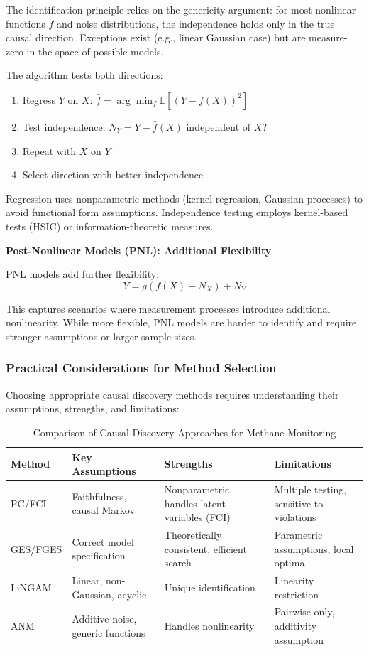 The identification principle relies on the genericity argument: for most nonlinear functions $f$ and noise distributions, the independence holds only in the true causal direction. Exceptions exist (e.g., linear Gaussian case) but are measure-zero in the space of possible models.

The algorithm tests both directions:
\begin{enumerate}
\item Regress $Y$ on $X$: $\hat{f} = \arg\min_f \mathbb{E}[(Y - f(X))^2]$
\item Test independence: $N_Y = Y - \hat{f}(X)$ independent of $X$?
\item Repeat with $X$ on $Y$
\item Select direction with better independence
\end{enumerate}

Regression uses nonparametric methods (kernel regression, Gaussian processes) to avoid functional form assumptions. Independence testing employs kernel-based tests (HSIC) or information-theoretic measures.

\textbf{Post-Nonlinear Models (PNL): Additional Flexibility}

PNL models add further flexibility:
\begin{equation}
Y = g(f(X) + N_X) + N_Y
\end{equation}

This captures scenarios where measurement processes introduce additional nonlinearity. While more flexible, PNL models are harder to identify and require stronger assumptions or larger sample sizes.

\subsubsection{Practical Considerations for Method Selection}

Choosing appropriate causal discovery methods requires understanding their assumptions, strengths, and limitations:

\begin{table}[h!]
\centering
\caption{Comparison of Causal Discovery Approaches for Methane Monitoring}
\label{tab:discovery_methods}
\begin{tabular}{p{2.5cm}|p{3.5cm}|p{3.5cm}|p{3.5cm}}
\hline
\textbf{Method} & \textbf{Key Assumptions} & \textbf{Strengths} & \textbf{Limitations} \\
\hline
PC/FCI & Faithfulness, causal Markov & Nonparametric, handles latent variables (FCI) & Multiple testing, sensitive to violations \\
GES/FGES & Correct model specification & Theoretically consistent, efficient search & Parametric assumptions, local optima \\
LiNGAM & Linear, non-Gaussian, acyclic & Unique identification & Linearity restriction \\
ANM & Additive noise, generic functions & Handles nonlinearity & Pairwise only, additivity assumption \\
\hline
\end{tabular}
\end{table}


